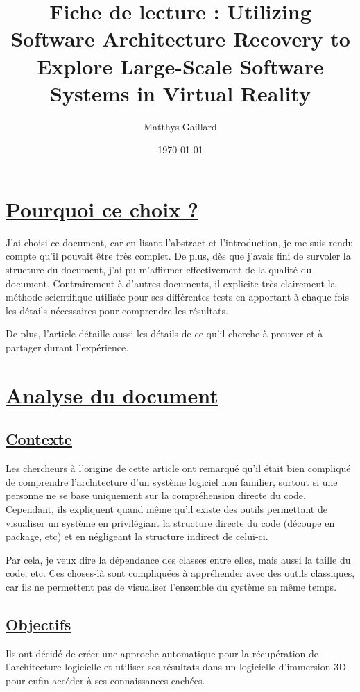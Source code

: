 \documentclass[a4paper,10pt, oneside]{article}
\title{Fiche de lecture : Utilizing Software Architecture Recovery to Explore Large-Scale Software Systems in Virtual Reality}
\author{Matthys Gaillard}
\date{\today}
\newcommand{\li}{\newline}
\begin{document}
\maketitle
\section{\ul{Pourquoi ce choix ?}}
    \par J'ai choisi ce document\cite{A1}, car en lisant l'abstract et l'introduction, je me suis rendu compte qu'il pouvait être très complet.
    De plus, dès que j'avais fini de survoler la structure du document, j'ai pu m'affirmer effectivement de la qualité du document.
    Contrairement à d'autres documents, il explicite très clairement la méthode scientifique utilisée pour ses différentes tests en apportant
    à chaque fois les détails nécessaires pour comprendre les résultats.\li
    \par De plus, l'article détaille aussi les détails de ce qu'il cherche à prouver et à partager durant l'expérience.
\section{\ul{Analyse du document}}
\subsection{\ul{Contexte}}
        \par Les chercheurs à l'origine de cette article ont remarqué qu'il était bien compliqué de comprendre l'architecture d'un système logiciel non familier,
        surtout si une personne ne se base uniquement sur la compréhension directe du code. Cependant, ils expliquent quand même qu'il existe des outils permettant 
        de visualiser un système en privilégiant la structure directe du code (découpe en package, etc) et en négligeant la structure indirect de celui-ci.\li
        \par Par cela, je veux dire la dépendance des classes entre elles, mais aussi la taille du code, etc. Ces choses-là sont compliquées à appréhender
        avec des outils classiques, car ils ne permettent pas de visualiser l'ensemble du système en même temps. 
\subsection{\ul{Objectifs}}
        \par Ils ont décidé de créer une approche automatique pour la récupération de l'architecture logicielle et utiliser ses résultats dans un logicielle d'immersion 3D
        pour enfin accéder à ses connaissances cachées.
\end{document}
